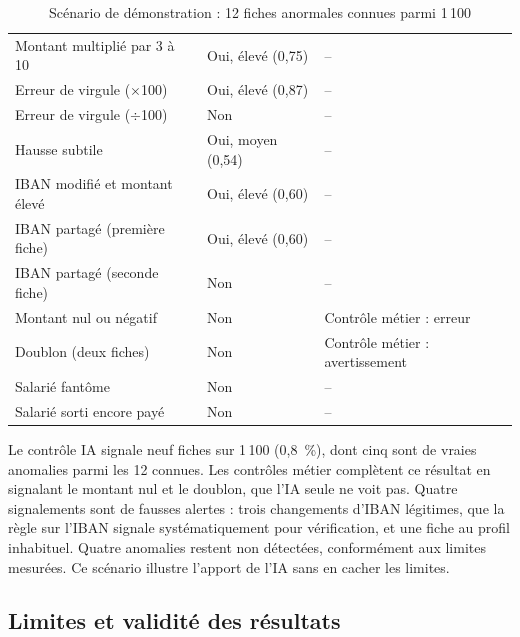 \begin{table}[H]
\centering
\footnotesize
\renewcommand{\arraystretch}{1.0}
\tablestyle
\begin{tabularx}{\textwidth}{|>{\raggedright\arraybackslash}p{4.8cm}|>{\raggedright\arraybackslash}p{3cm}|Y|}
\hline
{} &  &  \\
\hline
Montant multiplié par 3 à 10 & Oui, élevé (0,75) & -- \\
\hline
Erreur de virgule ($\times$100) & Oui, élevé (0,87) & -- \\
\hline
Erreur de virgule ($\div$100) & Non & -- \\
\hline
Hausse subtile & Oui, moyen (0,54) & -- \\
\hline
IBAN modifié et montant élevé & Oui, élevé (0,60) & -- \\
\hline
IBAN partagé (première fiche) & Oui, élevé (0,60) & -- \\
\hline
IBAN partagé (seconde fiche) & Non & -- \\
\hline
Montant nul ou négatif & Non & Contrôle métier : erreur \\
\hline
Doublon (deux fiches) & Non & Contrôle métier : avertissement \\
\hline
Salarié fantôme & Non & -- \\
\hline
Salarié sorti encore payé & Non & -- \\
\hline
\end{tabularx}
\caption{Scénario de démonstration : 12 fiches anormales connues parmi 1\,100}
\label{tab:scenario}
\end{table}

Le contrôle IA signale neuf fiches sur 1\,100 (0,8~\%), dont cinq sont de vraies anomalies parmi les 12 connues. Les contrôles métier complètent ce résultat en signalant le montant nul et le doublon, que l'IA seule ne voit pas. Quatre signalements sont de fausses alertes : trois changements d'IBAN légitimes, que la règle sur l'IBAN signale systématiquement pour vérification, et une fiche au profil inhabituel. Quatre anomalies restent non détectées, conformément aux limites mesurées. Ce scénario illustre l'apport de l'IA sans en cacher les limites.

\subsection{Limites et validité des résultats}

